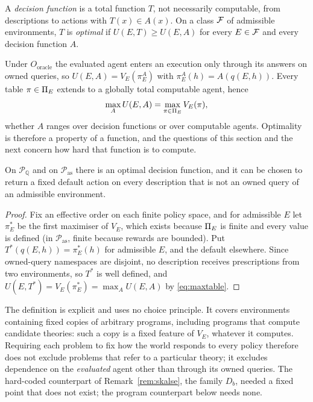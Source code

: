 \begin{definition}\label{def:decfn}
A \emph{decision function} is a total function $T$, not necessarily computable, from descriptions to
actions with $T(x)\in A(x)$. On a class $\mathcal{F}$ of admissible environments, $T$ is \emph{optimal} if
$U(E,T)\ge U(E,A)$ for every $E\in\mathcal{F}$ and every decision function $A$.
\end{definition}

Under $O_{\mathrm{oracle}}$ the evaluated agent enters an execution only through its answers on owned
queries, so $U(E,A)=V_E(\pi^A_E)$ with $\pi^A_E(h)=A(q(E,h))$. Every table $\pi\in\Pi_E$ extends to a
globally total computable agent, hence
\begin{equation}\label{eq:maxtable}
  \max_A U(E,A)=\max_{\pi\in\Pi_E}V_E(\pi),
\end{equation}
whether $A$ ranges over decision functions or over computable agents. Optimality is therefore a
property of a function, and the questions of this section and the next concern how hard that
function is to compute.

\begin{theorem}\label{thm:existence}
On $\mathcal P_{\mathbb Q}$ and on $\mathcal P_{\mathrm{as}}$ there is an optimal decision function,
and it can be chosen to return a fixed default action on every description that is not an owned query
of an admissible environment.
\end{theorem}

\begin{proof}
Fix an effective order on each finite policy space, and for admissible $E$ let $\pi^*_E$ be the first
maximiser of $V_E$, which exists because $\Pi_E$ is finite and every value is defined (in
$\mathcal P_{\mathrm{as}}$, finite because rewards are bounded). Put $T^*(q(E,h))=\pi^*_E(h)$ for
admissible $E$, and the default elsewhere. Since owned-query namespaces are disjoint, no description
receives prescriptions from two environments, so $T^*$ is well defined, and
$U(E,T^*)=V_E(\pi^*_E)=\max_A U(E,A)$ by \eqref{eq:maxtable}.
\end{proof}

The definition is explicit and uses no choice principle. It covers environments containing fixed
copies of arbitrary programs, including programs that compute candidate theories: such a copy is a
fixed feature of $V_E$, whatever it computes. Requiring each problem to fix how the world responds to
every policy therefore does not exclude problems that refer to a particular theory; it excludes
dependence on the \emph{evaluated} agent other than through its owned queries. The hard-coded
counterpart of Remark~\ref{rem:skalse}, the family $D_b$, needed a fixed point that does not exist;
the program counterpart below needs none.

